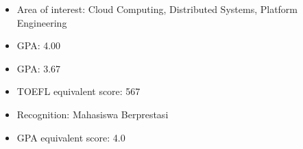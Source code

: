 \newpage
{}
\begin{itemize}
  \item Area of interest: Cloud Computing, Distributed Systems, Platform Engineering
  \item GPA: 4.00
\end{itemize}

\begin{itemize}
  \item GPA: 3.67
  \item TOEFL equivalent score: 567
  \item Recognition: Mahasiswa Berprestasi
\end{itemize}

\begin{itemize}
  \item GPA equivalent score: 4.0
\end{itemize}
